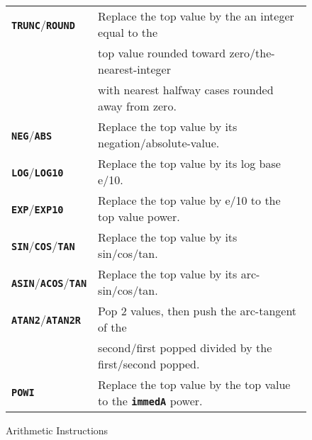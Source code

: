 \documentclass[12pt]{article}
\newcommand{\TT}[1]{{\tt \bfseries #1}}
\newlength{\figurewidth}
\newenvironment{boxedfigure}[1][!btp]%
	{\begin{figure*}[#1]
	 \begin{lrbox}{\figurebox}
	 \begin{minipage}{\figurewidth}

	 \vspace*{1ex}}%
	{
	 \vspace*{1ex}

	 \end{minipage}
	 \end{lrbox}

	 \centering
	 \fbox{\hspace*{0.1in}\usebox{\figurebox}\hspace*{0.1in}}
	 \end{figure*}}
\begin{document}
\begin{boxedfigure}
\begin{center}
\begin{tabular}{|l|l|}
\TT{TRUNC}/\TT{ROUND}
    & Replace the top value by the an integer equal to the \\
    & top value rounded toward zero/the-nearest-integer \\
    & with nearest halfway cases rounded away from zero.
\\\hline
\TT{NEG}/\TT{ABS}
    & Replace the top value by its negation/absolute-value.
\\\hline
\TT{LOG}/\TT{LOG10}
    & Replace the top value by its log base e/10.
\\\hline
\TT{EXP}/\TT{EXP10}
    & Replace the top value by e/10 to the top value power.
\\\hline
\TT{SIN}/\TT{COS}/\TT{TAN}
    & Replace the top value by its sin/cos/tan.
\\\hline
\TT{ASIN}/\TT{ACOS}/\TT{TAN}
    & Replace the top value by its arc- sin/cos/tan.
\\\hline
\TT{ATAN2}/\TT{ATAN2R}
    & Pop 2 values, then push the arc-tangent of the \\
    & second/first popped divided by the first/second popped.
\\\hline
\TT{POWI}
    & Replace the top value by the top value to the \TT{immedA} power.
\\\hline
\end{tabular}
\end{center}
\caption{Arithmetic Instructions}
\label{ARITHMETIC-INSTRUCTIONS}
\end{boxedfigure}
\end{document}
